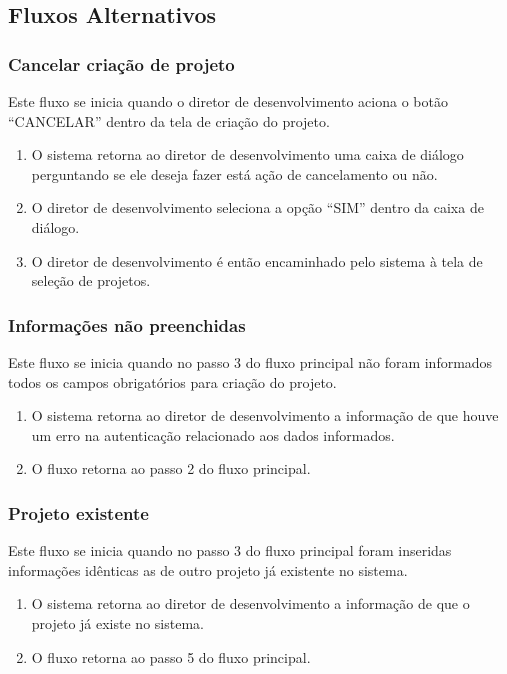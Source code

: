 \subsection{Fluxos Alternativos}

\subsubsection{Cancelar criação de projeto}
Este fluxo se inicia quando o diretor de desenvolvimento aciona o botão “CANCELAR” dentro da tela de criação do projeto.

\begin{enumerate}
  \item O sistema retorna ao diretor de desenvolvimento uma caixa de diálogo perguntando se ele deseja fazer está ação de cancelamento ou não.
  \item O diretor de desenvolvimento seleciona a opção “SIM” dentro da caixa de diálogo.
  \item O diretor de desenvolvimento é então encaminhado pelo sistema à tela de seleção de projetos.
\end{enumerate}

\subsubsection{Informações não preenchidas}
Este fluxo se inicia quando no passo 3 do fluxo principal não foram informados todos os campos obrigatórios para criação do projeto.

\begin{enumerate}
  \item O sistema retorna ao diretor de desenvolvimento a informação de que houve um erro na autenticação relacionado aos dados informados.
  \item O fluxo retorna ao passo 2 do fluxo principal.
\end{enumerate}

\subsubsection{Projeto existente}
Este fluxo se inicia quando no passo 3 do fluxo principal foram inseridas informações idênticas as de outro projeto já existente no sistema. 

\begin{enumerate}
  \item O sistema retorna ao diretor de desenvolvimento a informação de que o projeto já existe no sistema.
  \item O fluxo retorna ao passo 5 do fluxo principal.
\end{enumerate}


